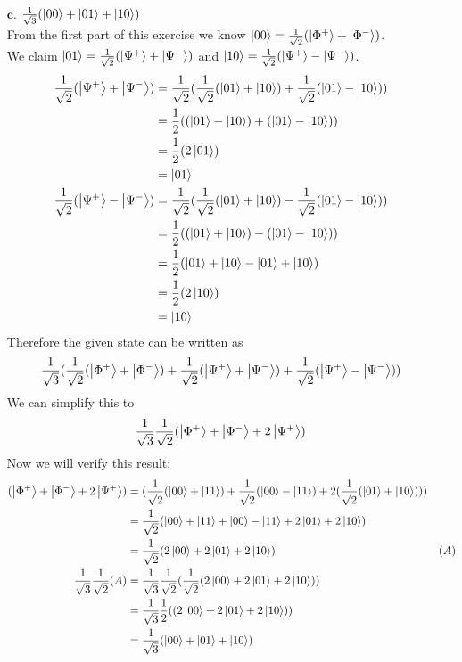 \documentclass[11pt]{article}
\def\haf{\frac{1}{2}}
\def\srtt{\ensuremath\frac{1}{\sqrt{2}}}
\def\bpp{\ket{\Phi^{+}}}
\def\bpm{\ket{\Phi^{-}}}
\def\bsp{\ket{\Psi^{+}}}
\def\bsm{\ket{\Psi^{-}}}
\begin{document}
\begin{itemize}
    \item[$\textbf{c.}$] $\frac{1}{\sqrt{3}}(\ket{00} + \ket{01} + \ket{10})$  \\
        From the first part of this exercise we know $\ket{00} = \srtt(\bpp + \bpm)$.  \\
        We claim $\ket{01} = \srtt(\bsp + \bsm)$ and $\ket{10} = \srtt(\bsp - \bsm)$. 
        \begin{align*}
            \srtt(\bsp + \bsm) &= \srtt(\srtt(\ket{01} + \ket{10}) + \srtt(\ket{01} - \ket{10})) \\
            &= \haf((\ket{01} - \ket{10}) + (\ket{01} - \ket{10})) \\
            &= \haf(2\ket{01}) \\
            &= \ket{01} \\
            \srtt(\bsp - \bsm) &= \srtt(\srtt(\ket{01} + \ket{10}) - \srtt(\ket{01} - \ket{10})) \\
            &= \haf((\ket{01} + \ket{10}) - (\ket{01} - \ket{10})) \\
            &= \haf(\ket{01} + \ket{10} - \ket{01} + \ket{10}) \\
            &= \haf(2\ket{10}) \\
            &= \ket{10} 
        \end{align*}
        Therefore the given state can be written as $$\frac{1}{\sqrt{3}}(\srtt(\bpp + \bpm) + \srtt(\bsp + \bsm) + \srtt(\bsp - \bsm))$$
        We can simplify this to  
        $$\frac{1}{\sqrt{3}}\srtt(\bpp + \bpm + 2\bsp)$$
        Now we will verify this result:
        \begin{align*}
            (\bpp + \bpm + 2\bsp)  %
            &= (\srtt(\ket{00} + \ket{11}) + \srtt(\ket{00} - \ket{11}) + 2(\srtt(\ket{01} + \ket{10}))) \\
            &= \srtt(\ket{00} + \ket{11} + \ket{00} - \ket{11} + 2\ket{01} + 2\ket{10}) \\
            &= \srtt(2\ket{00} + 2\ket{01} + 2\ket{10}) & (A) \\
            \frac{1}{\sqrt{3}}\srtt(A) &= \frac{1}{\sqrt{3}}\srtt(\srtt(2\ket{00} + 2\ket{01} + 2\ket{10})) \\
            &= \frac{1}{\sqrt{3}}\haf((2\ket{00} + 2\ket{01} + 2\ket{10})) \\
            &= \frac{1}{\sqrt{3}}(\ket{00} + \ket{01} + \ket{10}) 
        \end{align*}
\end{itemize}
\end{document}
